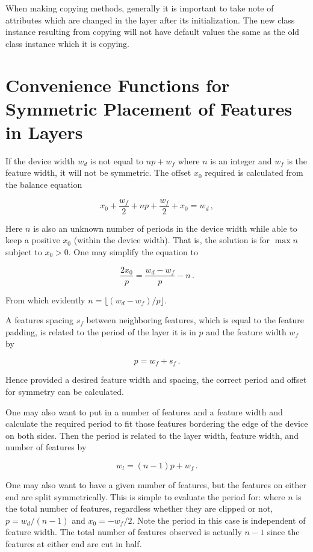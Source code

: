 \documentclass{article}
\begin{document}
When making copying methods, generally it is important to take note of attributes which are changed in the layer after its initialization. The new class instance resulting from copying will not have default values the same as the old class instance which it is copying.

\section{Convenience Functions for Symmetric Placement of Features in Layers}

If the device width $w_d$ is not equal to $np + w_f$ where $n$ is an integer and $w_f$ is the feature width, it will not be symmetric. The offset $x_0$ required is calculated from the balance equation

$$x_0 + \frac{w_f}{2} + np + \frac{w_f}{2} + x_0 = w_d\,, $$

Here $n$ is also an unknown number of periods in the device width while able to keep a positive $x_0$ (within the device width). That is, the solution is for $\max n$ subject to $x_0 > 0$. One may simplify the equation to 

$$\frac{2x_0}{p} = \frac{w_d - w_f}{p} - n \,. $$

From which evidently $n = \lfloor (w_d - w_f)/p \rfloor$.

A features spacing $s_f$ between neighboring features, which is equal to the feature padding, is related to the period of the layer it is in $p$ and the feature width $w_f$ by

$$p = w_f + s_f \,.$$

Hence provided a desired feature width and spacing, the correct period and offset for symmetry can be calculated.

One may also want to put in a number of features and a feature width and calculate the required period to fit those features bordering the edge of the device on both sides. Then the period is related to the layer width, feature width, and number of features by

$$ w_l = (n-1)p + w_f\,. $$

One may also want to have a given number of features, but the features on either end are split symmetrically. This is simple to evaluate the period for: where $n$ is the total number of features, regardless whether they are clipped or not, $p = w_d/(n-1)$ and $x_0 = -w_f/2$. Note the period in this case is independent of feature width. The total number of features observed is actually $n-1$ since the features at either end are cut in half.
\end{document}
